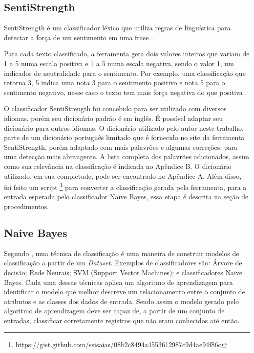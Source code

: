 \subsection{SentiStrength}
SentiStrength é um classificador léxico que utiliza regras de linguística para detectar a força de um sentimento em uma frase \cite{thelwall2012sentistrength}.

Para cada texto classificado, a ferramenta gera dois valores inteiros que variam de 1 a 5 numa escala positiva e 1 a 5 numa escala negativa, sendo o valor 1, um indicador de neutralidade para o sentimento. Por exemplo, uma classificação que retorna 3, 5 indica uma nota 3 para o sentimento positivo e nota 5 para o sentimento negativo, nesse caso o texto tem mais força negativa do que positiva \cite{thelwall2012sentistrength}.

O classificador SentiStrength foi concebido para ser utilizado com diversos idiomas, porém seu dicionário padrão é em inglês. É possível adaptar seu dicionário para outros idiomas. O dicionário utilizado pelo autor neste trabalho, parte de um dicionário português limitado que é fornecido no site da ferramenta SentiStrength, porém adaptado com mais palavrões e algumas correções, para uma detecção mais abrangente. A lista completa dos palavrões adicionados, assim como sua relevância na classificação é indicada no Apêndice B. O dicionário utilizado, em sua completude, pode ser encontrado no Apêndice A. Além disso, foi feito um script \footnote{https://gist.github.com/ssisaias/08b2c8494a4553612987c9d4ae94f86c} para converter a classificação gerada pela ferramenta, para a entrada esperada pelo classificador Naïve Bayes, essa etapa é descrita na seção de procedimentos.


\subsection{Naive Bayes}
Segundo \cite{tan2009DataMining}, uma técnica de classificação é uma maneira de construir modelos de classificação a partir de um \textit{Dataset}. Exemplos de classificadores são: Árvore de decisão; Rede Neurais; SVM (Support Vector Machines); e classificadores Naïve Bayes.
Cada uma dessas técnicas aplica um algoritmo de aprendizagem para identificar o modelo que melhor descreve um relacionamento entre o conjunto de atributos e as classes dos dados de entrada. Sendo assim o modelo gerado pelo algoritmo de aprendizagem deve ser capaz de, a partir de um conjunto de entradas, classificar corretamente registros que não eram conhecidos até então.

